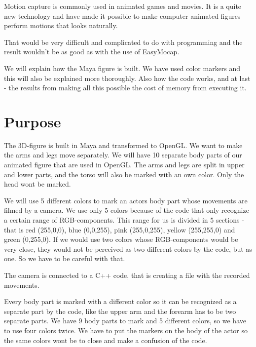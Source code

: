 \documentclass{article}
\begin{document}
Motion capture is commonly used in animated games and movies.
It is a quite new technology and have made it possible to make computer animated figures perform motions that looks naturally.

That would be very difficult and complicated to do with programming and the result wouldn't be as good as with the use of EasyMocap.

We will explain how the Maya figure is built. We have used color markers and this will also be explained more thoroughly. Also how the code works, and at last - the results from making all this possible the cost of memory from executing it.







    \section{Purpose}
The 3D-figure is built in Maya and transformed to OpenGL.
We want to make the arms and legs move separately. We will have 10 separate body parts of our animated figure that are used in OpenGL. The arms and legs are split in upper and lower parts, and the torso will also be marked with an own color. Only the head wont be marked.

We will use 5 different colors to mark an actors body part whose movements are filmed by a camera. We use only 5 colors because of the code that only recognize a certain range of RGB-components. This range for us is divided in 5 sections - that is red (255,0,0), blue (0,0,255), pink (255,0,255), yellow (255,255,0) and green (0,255,0). If we would use two colors whose RGB-components would be very close, they would not be perceived as two different colors by the code, but as one. So we have to be careful with that.

The camera is connected to a C++ code, that is creating a file with the recorded movements.

Every body part is marked with a different color so it can be recognized as a separate part by the code, like the upper arm and the forearm has to be two separate parts. We have 9 body parts to mark and 5 different colors, so we have to use four colors twice. We have to put the markers on the body of the actor so the same colors wont be to close and make a confusion of the code.
\end{document}
